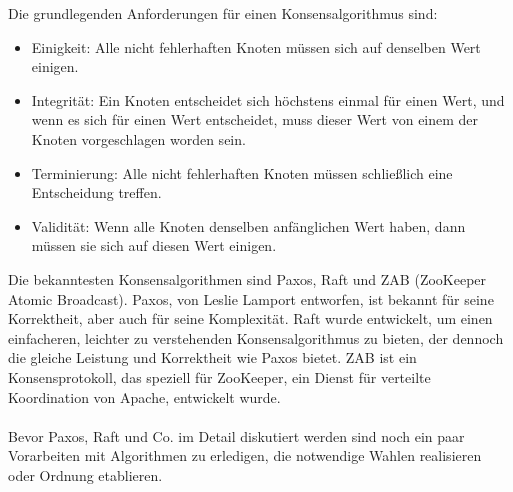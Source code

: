 Die grundlegenden Anforderungen für einen Konsensalgorithmus sind:
\begin{itemize}
\item Einigkeit: Alle nicht fehlerhaften Knoten müssen sich auf denselben Wert einigen.
\item Integrität: Ein Knoten entscheidet sich höchstens einmal für einen Wert, und wenn es sich für einen Wert entscheidet, muss dieser Wert von einem der Knoten vorgeschlagen worden sein.
\item Terminierung: Alle nicht fehlerhaften Knoten müssen schließlich eine Entscheidung treffen.
\item Validität: Wenn alle Knoten denselben anfänglichen Wert haben, dann müssen sie sich auf diesen Wert einigen.
\end{itemize}
Die bekanntesten Konsensalgorithmen sind Paxos, Raft und ZAB (ZooKeeper Atomic Broadcast). Paxos, von Leslie Lamport entworfen, ist bekannt für seine Korrektheit, aber auch für seine Komplexität. Raft wurde entwickelt, um einen einfacheren, leichter zu verstehenden Konsensalgorithmus zu bieten, der dennoch die gleiche Leistung und Korrektheit wie Paxos bietet. ZAB ist ein Konsensprotokoll, das speziell für ZooKeeper, ein Dienst für verteilte Koordination von Apache, entwickelt wurde.
\\\\
Bevor Paxos, Raft und Co. im Detail diskutiert werden sind noch ein paar Vorarbeiten mit Algorithmen zu erledigen, die notwendige Wahlen realisieren oder Ordnung etablieren.


